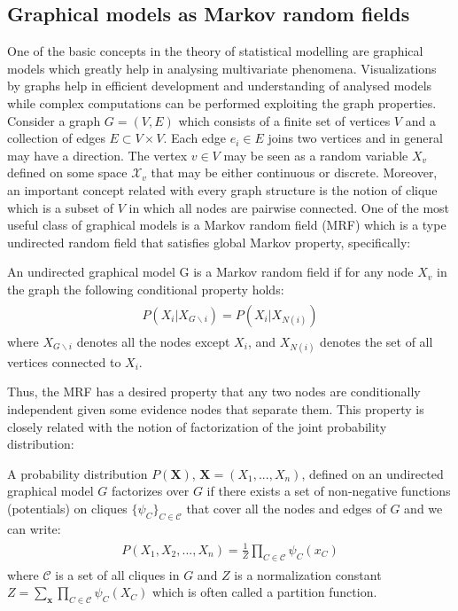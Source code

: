 \documentclass[../report/report.tex]{subfiles}
\begin{document}
\subsection{Graphical models as Markov random fields}
One of the basic concepts in the theory of statistical modelling are graphical models which greatly help in analysing multivariate phenomena. Visualizations by graphs help in efficient development and understanding of analysed models while complex computations can be performed exploiting the graph properties. Consider a graph $G = (V,E)$ which consists of a finite set of vertices $V$ and a collection of edges $E \subset V \times V$. Each edge $e_i \in E$ joins two vertices and in general may have a direction. The vertex $v \in V$ may be seen as a random variable $X_v$ defined on some space $\mathcal{X}_v$ that may be either continuous or discrete. Moreover, an important concept related with every graph structure is the notion of clique which is a subset of $V$ in which all nodes are pairwise connected. One of the most useful class of graphical models is a Markov random field (MRF) which is a type undirected random field that satisfies global Markov property, specifically:
\begin{mydef} An undirected graphical model G is a Markov random field if for any node $X_v$ in the graph the following conditional property holds:
\begin{align*}
\begin{split}
P(X_i |X_{G\backslash i} ) = P(X_i | X_{N(i)})
\end{split}
\end{align*}
where $X_{G\backslash i}$ denotes all the nodes except $X_i$, and $X_{N(i)}$ denotes the set of all vertices connected to $X_i$.
\end{mydef}
Thus, the MRF has a desired property that any two nodes are conditionally independent given some evidence nodes that separate them. This property is closely related with the notion of factorization of the joint probability distribution:
\begin{mydef} A probability distribution $P(\mathbf{X})$, $\mathbf{X} =(X_1,..., X_n)$, defined on an undirected graphical model $G$ factorizes over $G$ if there exists a set of non-negative functions (potentials) on cliques $\{ \psi_{C} \}_{C \in \mathcal{C}}$  that cover all the nodes and edges of $G$ and we can write:
\begin{align*}
\begin{split}
P(X_1, X_2, ..., X_n) = \frac{1}{Z} \prod_{C \in \mathcal{C}} \psi
_C(x_C)
\end{split}
\end{align*}
where $\mathcal{C}$ is a set of all cliques in $G$ and $Z$ is a normalization constant $Z = \sum_{\mathbf{x}} \prod_{C \in \mathcal{C}} \psi_C(X_C) $ which is often called a partition function.
\end{mydef}
\end{document}
